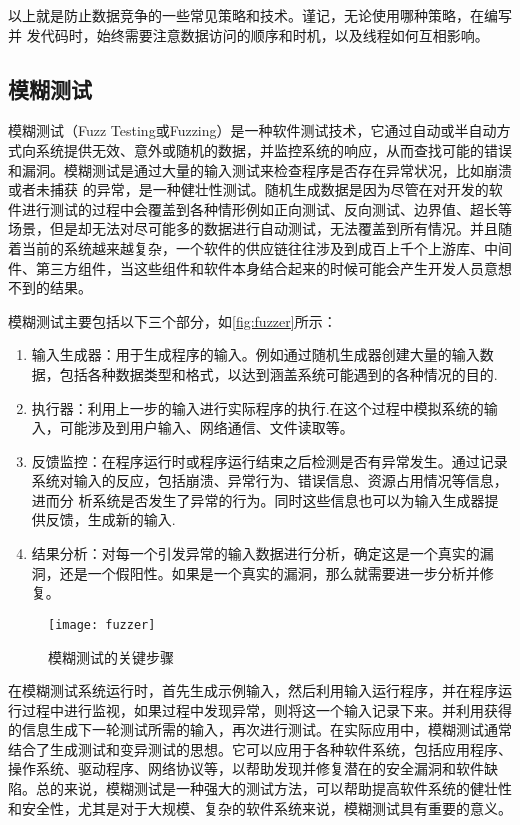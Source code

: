 以上就是防止数据竞争的一些常见策略和技术。谨记，无论使用哪种策略，在编写并 发代码时，始终需要注意数据访问的顺序和时机，以及线程如何互相影响。

\subsection{模糊测试}

模糊测试（Fuzz Testing或Fuzzing）是一种软件测试技术，它通过自动或半自动方式向系统提供无效、意外或随机的数据，并监控系统的响应，从而查找可能的错误和漏洞。模糊测试是通过大量的输入测试来检查程序是否存在异常状况，比如崩溃或者未捕获 的异常，是一种健壮性测试。随机生成数据是因为尽管在对开发的软件进行测试的过程中会覆盖到各种情形例如正向测试、反向测试、边界值、超长等场景，但是却无法对尽可能多的数据进行自动测试，无法覆盖到所有情况。并且随着当前的系统越来越复杂，一个软件的供应链往往涉及到成百上千个上游库、中间件、第三方组件，当这些组件和软件本身结合起来的时候可能会产生开发人员意想不到的结果。

模糊测试主要包括以下三个部分，如\autoref{fig:fuzzer}\cite{zhu2022fuzzing}所示：

\begin{enumerate}
\item 输入生成器：用于生成程序的输入。例如通过随机生成器创建大量的输入数据，包括各种数据类型和格式，以达到涵盖系统可能遇到的各种情况的目的.
\item 执行器：利用上一步的输入进行实际程序的执行.在这个过程中模拟系统的输入，可能涉及到用户输入、网络通信、文件读取等。
\item 反馈监控：在程序运行时或程序运行结束之后检测是否有异常发生。通过记录系统对输入的反应，包括崩溃、异常行为、错误信息、资源占用情况等信息，进而分 析系统是否发生了异常的行为。同时这些信息也可以为输入生成器提供反馈，生成新的输入.
\item 结果分析：对每一个引发异常的输入数据进行分析，确定这是一个真实的漏洞，还是一个假阳性。如果是一个真实的漏洞，那么就需要进一步分析并修复。
\end{enumerate}

\begin{figure}[ht]
    \centering
    \texttt{[image: fuzzer]}
    \caption{\label{fig:fuzzer}模糊测试的关键步骤}
\end{figure}


在模糊测试系统运行时，首先生成示例输入，然后利用输入运行程序，并在程序运行过程中进行监视，如果过程中发现异常，则将这一个输入记录下来。并利用获得的信息生成下一轮测试所需的输入，再次进行测试。在实际应用中，模糊测试通常结合了生成测试和变异测试的思想。它可以应用于各种软件系统，包括应用程序、操作系统、驱动程序、网络协议等，以帮助发现并修复潜在的安全漏洞和软件缺陷。总的来说，模糊测试是一种强大的测试方法，可以帮助提高软件系统的健壮性和安全性，尤其是对于大规模、复杂的软件系统来说，模糊测试具有重要的意义。


